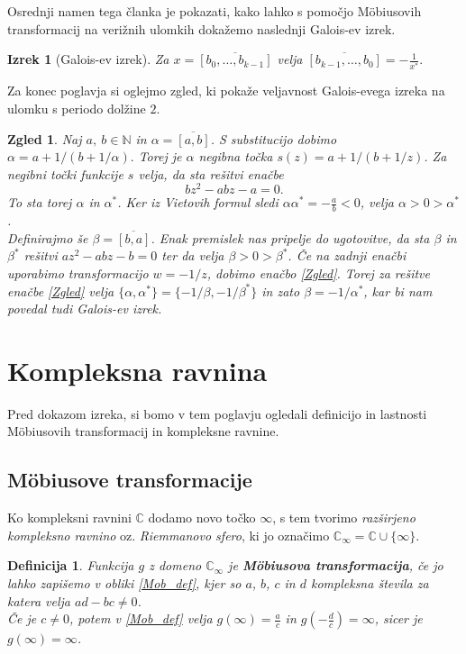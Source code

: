 \documentclass[a4paper,12pt]{article}
\def\N{\mathbb{N}} %
\def\C{\mathbb{C}} %
\def\Ci{\mathbb{C}_{\infty}} %
\newtheorem*{izrek}{Izrek}
\newtheorem{definicija}{Definicija}
\newtheorem{zgled}{Zgled}
\begin{document}
Osrednji namen tega članka je pokazati, kako lahko s pomočjo M\"obiusovih transformacij na verižnih ulomkih dokažemo naslednji Galois-ev izrek.

\begin{izrek}[Galois-ev izrek]
    \label{Galois}
	Za $x = \overline{[b_0, \ldots, b_{k-1}]}$ velja $\overline{[b_{k-1}, \ldots, b_0]} = - \frac{1}{x^*}.$
\end{izrek}

Za konec poglavja si oglejmo zgled, ki pokaže veljavnost Galois-evega izreka na ulomku s periodo dolžine $2$.

\begin{zgled}
Naj $a,\ b \in \N$ in $\alpha = \overline{[a, b]}$. S substitucijo dobimo $\alpha = a + 1/(b + 1/\alpha).$ Torej je $\alpha$ negibna točka $s(z) = a + 1/(b + 1/z)$. Za negibni točki funkcije $s$ velja, da sta rešitvi enačbe 
\begin{equation}
    \label{Zgled}
    bz^2 - abz - a = 0.
\end{equation}
To sta torej $\alpha$ in $\alpha^*$. Ker iz Vietovih formul sledi $\alpha\alpha^* = - \frac{a}{b} < 0$, velja $\alpha > 0 > \alpha^*$.\\
Definirajmo še $\beta = \overline{[b, a]}$. Enak premislek nas pripelje do ugotovitve, da sta $\beta$ in $\beta^*$ rešitvi $az^2 - abz - b =0$ ter da velja $\beta > 0 > \beta^*$. Če na zadnji enačbi uporabimo transformacijo $w = - 1 / z$, dobimo enačbo \eqref{Zgled}. Torej za rešitve enačbe \eqref{Zgled} velja $\{\alpha, \alpha^*\} = \{-1/\beta, -1/\beta^*\}$ in zato $\beta = -1/\alpha^*$, kar bi nam povedal tudi Galois-ev izrek.
\end{zgled}
\newpage


\section{Kompleksna ravnina}
\label{Pogled_pogl}

Pred dokazom izreka, si bomo v tem poglavju ogledali definicijo in lastnosti M\"obiusovih transformacij in kompleksne ravnine.


\subsection{M\"obiusove transformacije}
Ko kompleksni ravnini $\C$ dodamo novo točko $\infty$, s tem tvorimo \emph{razširjeno kompleksno ravnino} oz. \emph{Riemmanovo sfero}, ki jo označimo $\Ci = \C \cup \{\infty\}$.
\begin{definicija}
Funkcija $g$ z domeno $\Ci$ je \textbf{M\"obiusova transformacija}, če jo lahko zapišemo v obliki \eqref{Mob_def}, kjer so $a$, $b$, $c$ in $d$ kompleksna števila za katera velja $ad - bc \neq 0$. \\
Če je $c \neq 0$, potem v \eqref{Mob_def} velja $g(\infty) = \frac{a}{c}$ in $g(-\frac{d}{c}) = \infty$, sicer je $g(\infty) = \infty$.
\end{definicija}
\end{document}
